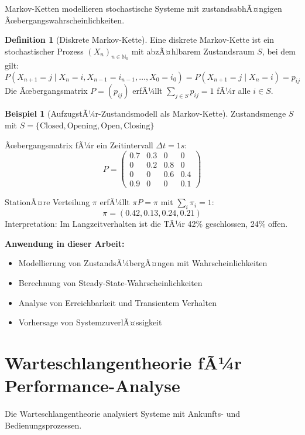 ﻿\documentclass[a4paper,12pt]{report}
\theoremstyle{definition}
\newtheorem{definition}{Definition}[section]
\newtheorem{beispiel}{Beispiel}[section]
\begin{document}
Markov-Ketten \cite{stewart1994} modellieren stochastische Systeme mit zustandsabhÃ¤ngigen Ãœbergangs\-wahrscheinlichkeiten.

\begin{definition}[Diskrete Markov-Kette]
	Eine diskrete Markov-Kette ist ein stochastischer Prozess $(X_n)_{n \in \mathbb{N}_0}$ mit abzÃ¤hlbarem Zustandsraum $S$, bei dem gilt:
	\[
	P(X_{n+1} = j \mid X_n = i, X_{n-1} = i_{n-1}, \ldots, X_0 = i_0) = P(X_{n+1} = j \mid X_n = i) = p_{ij}
	\]
	Die Ãœbergangsmatrix $P = (p_{ij})$ erfÃ¼llt $\sum_{j \in S} p_{ij} = 1$ fÃ¼r alle $i \in S$.
\end{definition}

\begin{beispiel}[AufzugstÃ¼r-Zustandsmodell als Markov-Kette]
	Zustandsmenge $S$ mit $S = \{\text{Closed}, \text{Opening}, \text{Open}, \text{Closing}\}$
	
	Ãœbergangsmatrix fÃ¼r ein Zeitintervall $\Delta t = 1s$:
	\[
	P = \begin{pmatrix}
		0.7 & 0.3 & 0 & 0 \\
		0 & 0.2 & 0.8 & 0 \\
		0 & 0 & 0.6 & 0.4 \\
		0.9 & 0 & 0 & 0.1
	\end{pmatrix}
	\]
	
	StationÃ¤re Verteilung $\pi$ erfÃ¼llt $\pi P = \pi$ mit $\sum_i \pi_i = 1$:
	\[
	\pi = (0.42, 0.13, 0.24, 0.21)
	\]
	Interpretation: Im Langzeitverhalten ist die TÃ¼r 42\% geschlossen, 24\% offen.
\end{beispiel}

\textbf{Anwendung in dieser Arbeit:}
\begin{itemize}
	\item[-] Modellierung von ZustandsÃ¼bergÃ¤ngen mit Wahrscheinlichkeiten
	\item[-] Berechnung von Steady-State-Wahrscheinlichkeiten
	\item[-] Analyse von Erreichbarkeit und Transientem Verhalten
	\item[-] Vorhersage von SystemzuverlÃ¤ssigkeit
\end{itemize}

\section{Warteschlangentheorie fÃ¼r Performance-Analyse}

Die Warteschlangentheorie \cite{kleinrock1975} analysiert Systeme mit Ankunfts- und Bedienungsprozessen.
\end{document}
